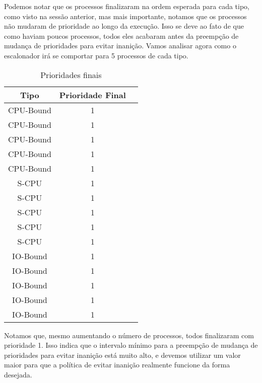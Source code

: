\documentclass{article}
\begin{document}
Podemos notar que os processos finalizaram na ordem esperada para cada tipo,
como visto na sessão anterior, mas mais importante, notamos que os processos
não mudaram de prioridade ao longo da execução. Isso se deve ao fato de que como
haviam poucos processos, todos eles acabaram antes da preempção de mudança de
prioridades para evitar inanição. Vamos analisar agora como o escalonador irá
se comportar para 5 processos de cada tipo.

\begin{table}[H]
      \centering
      \begin{tabular}{|c|c|c|}
            \hline
            \textbf{Tipo} & \textbf{Prioridade Final} \\
            \hline
            CPU-Bound     & 1                         \\
            CPU-Bound     & 1                         \\
            CPU-Bound     & 1                         \\
            CPU-Bound     & 1                         \\
            CPU-Bound     & 1                         \\
            S-CPU         & 1                         \\
            S-CPU         & 1                         \\
            S-CPU         & 1                         \\
            S-CPU         & 1                         \\
            S-CPU         & 1                         \\
            IO-Bound      & 1                         \\
            IO-Bound      & 1                         \\
            IO-Bound      & 1                         \\
            IO-Bound      & 1                         \\
            IO-Bound      & 1                         \\
            \hline
      \end{tabular}
      \caption{Prioridades finais}
\end{table}

Notamos que, mesmo aumentando o número de processos, todos finalizaram com
prioridade 1. Isso indica que o intervalo mínimo para a preempção de mudança de
prioridades para evitar inanição está muito alto, e devemos utilizar um valor
maior para que a política de evitar inanição realmente funcione da forma
desejada.
\end{document}
